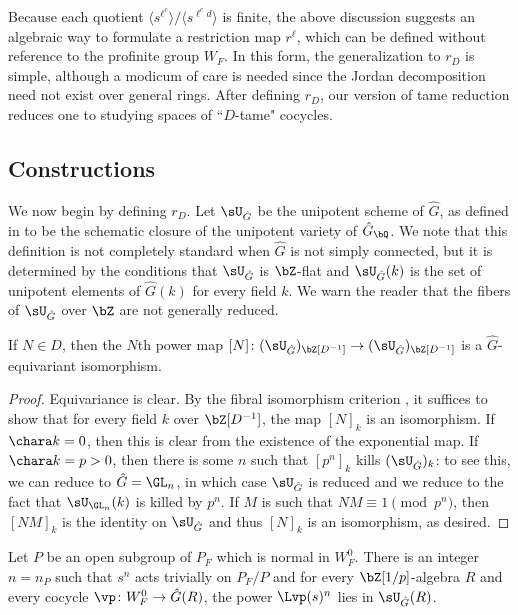Because each quotient $\langle s^{\ell^c} \rangle/\langle s^{\ell^c d} \rangle$ is finite, the above discussion suggests an algebraic way to formulate a restriction map $r^\ell$, which can be defined without reference to the profinite group $W_F$. In this form, the generalization to $r_D$ is simple, although a modicum of care is needed since the Jordan decomposition need not exist over general rings. After defining $r_D$, our version of tame reduction reduces one to studying spaces of ``$D$-tame" cocycles.

\subsection{Constructions}

We now begin by defining $r_D$. Let $\sU_{\hat{G}}$ be the unipotent scheme of $\hat{G}$, as defined in \cite[\S 4]{Cotner-Springer} to be the schematic closure of the unipotent variety of $\hat{G}_{\bQ}$. We note that this definition is not completely standard when $\hat{G}$ is not simply connected, but it is determined by the conditions that $\sU_{\hat{G}}$ is $\bZ$-flat and $\sU_{\hat{G}}(k)$ is the set of unipotent elements of $\hat{G}(k)$ for every field $k$. We warn the reader that the fibers of $\sU_{\hat{G}}$ over $\bZ$ are not generally reduced.

\begin{lemma}\label{lemma:power-iso-unipotent-scheme}
    If $N \in D$, then the $N$th power map $[N]\colon (\sU_{\hat{G}})_{\bZ[D^{-1}]} \to (\sU_{\hat{G}})_{\bZ[D^{-1}]}$ is a $\hat{G}$-equivariant isomorphism.
\end{lemma}

\begin{proof}
    Equivariance is clear. By the fibral isomorphism criterion \cite[IV\textsubscript{4}, 17.9.5]{EGA}, it suffices to show that for every field $k$ over $\bZ[D^{-1}]$, the map $[N]_k$ is an isomorphism. If $\chara k = 0$, then this is clear from the existence of the exponential map. If $\chara k = p > 0$, then there is some $n$ such that $[p^n]_k$ kills $(\sU_{\hat{G}})_k$: to see this, we can reduce to $\hat{G} = \GL_n$, in which case $\sU_{\hat{G}}$ is reduced and we reduce to the fact that $\sU_{\GL_n}(k)$ is killed by $p^n$. If $M$ is such that $NM \equiv 1 \pmod{p^n}$, then $[NM]_k$ is the identity on $\sU_{\hat{G}}$ and thus $[N]_k$ is an isomorphism, as desired.
\end{proof}

\begin{lemma}\label{lemma:bounded-order-of-inertia}
    Let $P$ be an open subgroup of $P_F$ which is normal in $W_F^0$. There is an integer $n = n_P$ such that $s^n$ acts trivially on $P_F/P$ and for every $\bZ[1/p]$-algebra $R$ and every cocycle $\vp\colon W_F^0 \to \hat{G}(R)$, the power $\Lvp(s)^n$ lies in $\sU_{\hat{G}}(R)$.
\end{lemma}


